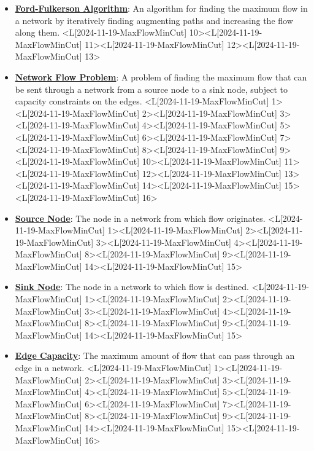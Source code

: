 \documentclass{article}%
\begin{document}
\begin{itemize}[[leftmargin=*]]
\item \href{https://www.math.purdue.edu/~yipn/421/2024-11-19-MaxFlowMinCut.pdf#page=10}{\textbf{Ford{-}Fulkerson Algorithm}}: An algorithm for finding the maximum flow in a network by iteratively finding augmenting paths and increasing the flow along them. <L[2024-11-19-MaxFlowMinCut] 10><L[2024-11-19-MaxFlowMinCut] 11><L[2024-11-19-MaxFlowMinCut] 12><L[2024-11-19-MaxFlowMinCut] 13>%
\item \href{https://www.math.purdue.edu/~yipn/421/2024-11-19-MaxFlowMinCut.pdf#page=1}{\textbf{Network Flow Problem}}: A problem of finding the maximum flow that can be sent through a network from a source node to a sink node, subject to capacity constraints on the edges. <L[2024-11-19-MaxFlowMinCut] 1><L[2024-11-19-MaxFlowMinCut] 2><L[2024-11-19-MaxFlowMinCut] 3><L[2024-11-19-MaxFlowMinCut] 4><L[2024-11-19-MaxFlowMinCut] 5><L[2024-11-19-MaxFlowMinCut] 6><L[2024-11-19-MaxFlowMinCut] 7><L[2024-11-19-MaxFlowMinCut] 8><L[2024-11-19-MaxFlowMinCut] 9><L[2024-11-19-MaxFlowMinCut] 10><L[2024-11-19-MaxFlowMinCut] 11><L[2024-11-19-MaxFlowMinCut] 12><L[2024-11-19-MaxFlowMinCut] 13><L[2024-11-19-MaxFlowMinCut] 14><L[2024-11-19-MaxFlowMinCut] 15><L[2024-11-19-MaxFlowMinCut] 16>%
\item \href{https://www.math.purdue.edu/~yipn/421/2024-11-19-MaxFlowMinCut.pdf#page=1}{\textbf{Source Node}}: The node in a network from which flow originates. <L[2024-11-19-MaxFlowMinCut] 1><L[2024-11-19-MaxFlowMinCut] 2><L[2024-11-19-MaxFlowMinCut] 3><L[2024-11-19-MaxFlowMinCut] 4><L[2024-11-19-MaxFlowMinCut] 8><L[2024-11-19-MaxFlowMinCut] 9><L[2024-11-19-MaxFlowMinCut] 14><L[2024-11-19-MaxFlowMinCut] 15>%
\item \href{https://www.math.purdue.edu/~yipn/421/2024-11-19-MaxFlowMinCut.pdf#page=1}{\textbf{Sink Node}}: The node in a network to which flow is destined. <L[2024-11-19-MaxFlowMinCut] 1><L[2024-11-19-MaxFlowMinCut] 2><L[2024-11-19-MaxFlowMinCut] 3><L[2024-11-19-MaxFlowMinCut] 4><L[2024-11-19-MaxFlowMinCut] 8><L[2024-11-19-MaxFlowMinCut] 9><L[2024-11-19-MaxFlowMinCut] 14><L[2024-11-19-MaxFlowMinCut] 15>%
\item \href{https://www.math.purdue.edu/~yipn/421/2024-11-19-MaxFlowMinCut.pdf#page=1}{\textbf{Edge Capacity}}: The maximum amount of flow that can pass through an edge in a network. <L[2024-11-19-MaxFlowMinCut] 1><L[2024-11-19-MaxFlowMinCut] 2><L[2024-11-19-MaxFlowMinCut] 3><L[2024-11-19-MaxFlowMinCut] 4><L[2024-11-19-MaxFlowMinCut] 5><L[2024-11-19-MaxFlowMinCut] 6><L[2024-11-19-MaxFlowMinCut] 7><L[2024-11-19-MaxFlowMinCut] 8><L[2024-11-19-MaxFlowMinCut] 9><L[2024-11-19-MaxFlowMinCut] 14><L[2024-11-19-MaxFlowMinCut] 15><L[2024-11-19-MaxFlowMinCut] 16>%
\end{itemize}%
\end{document}
